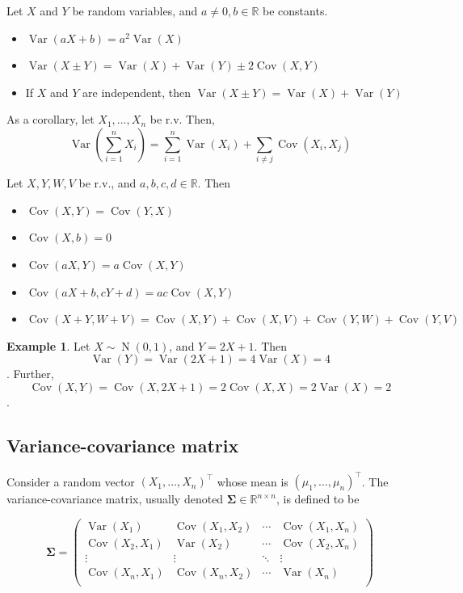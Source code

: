 \documentclass[
]{book}
\providecommand{\tightlist}{%
  \setlength{\itemsep}{0pt}\setlength{\parskip}{0pt}}
\newcommand{\bSigma}{{\boldsymbol\Sigma}}
\DeclareMathOperator{\Var}{Var}
\DeclareMathOperator{\Cov}{Cov}
\DeclareMathOperator{\N}{N}
\newcommand{\bbR}{\mathbb{R}}
\theoremstyle{definition}
\theoremstyle{definition}
\newtheorem{example}{Example}[chapter]
\theoremstyle{definition}
\theoremstyle{definition}
\theoremstyle{remark}
\begin{document}
Let \(X\) and \(Y\) be random variables, and \(a\neq0,b\in\bbR\) be constants.

\begin{itemize}
\tightlist
\item
  \(\Var(aX + b) = a^2\Var(X)\)
\item
  \(\Var(X \pm Y) = \Var(X) + \Var(Y) \pm 2\Cov(X,Y)\)
\item
  If \(X\) and \(Y\) are independent, then \(\Var(X \pm Y) = \Var(X) + \Var(Y)\)
\end{itemize}

As a corollary, let \(X_1,\dots,X_n\) be r.v. Then,
\[
\Var \left(\sum_{i=1}^nX_i \right) = \sum_{i=1}^n \Var(X_i) + \sum_{i\neq j}\Cov(X_i,X_j)
\]

Let \(X,Y,W,V\) be r.v., and \(a,b,c,d\in\bbR\). Then

\begin{itemize}
\tightlist
\item
  \(\Cov(X,Y) = \Cov(Y,X)\)
\item
  \(\Cov(X,b) = 0\)
\item
  \(\Cov(aX,Y) = a\Cov(X,Y)\)
\item
  \(\Cov(aX+b,cY+d)=ac\Cov(X,Y)\)
\item
  \(\Cov(X+Y,W+V)=\Cov(X,Y) + \Cov(X, V) + \Cov(Y,W) + \Cov(Y,V)\)
\end{itemize}

\begin{example}
Let \(X\sim\N(0,1)\), and \(Y=2X+1\). Then \[\Var(Y)=\Var(2X+1)=4\Var(X) = 4\]. Further, \[\Cov(X,Y)=\Cov(X,2X+1)=2\Cov(X,X)=2\Var(X)=2\].
\end{example}

\hypertarget{variance-covariance-matrix}{%
\subsection{Variance-covariance matrix}\label{variance-covariance-matrix}}

Consider a random vector \((X_1,\dots,X_n)^\top\) whose mean is \((\mu_1,\dots,\mu_n)^\top\).
The variance-covariance matrix, usually denoted \(\bSigma\in\bbR^{n\times n}\), is defined to be

\[
\bSigma = \begin{pmatrix}
\Var(X_1)   &\Cov(X_1,X_2) &\cdots &\Cov(X_1,X_n) \\
\Cov(X_2,X_1)   &\Var(X_2) &\cdots &\Cov(X_2,X_n) \\
\vdots &\vdots &\ddots&\vdots \\
\Cov(X_n,X_1)   &\Cov(X_n,X_2) &\cdots &\Var(X_n) \\
\end{pmatrix}
\]
\end{document}
